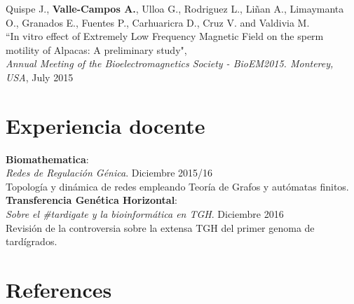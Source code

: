\documentclass[margin,line]{res}
\begin{document}
\begin{resume}
		Quispe J., \textbf{Valle-Campos A.}, Ulloa G., Rodriguez L., Liñan A., Limaymanta O., Granados E., Fuentes P., Carhuaricra D., Cruz V. and Valdivia M.\\ ``In vitro effect of Extremely Low Frequency Magnetic Field on the sperm motility of Alpacas: A preliminary study", \\ {\em Annual Meeting of the Bioelectromagnetics Society - BioEM2015. Monterey, USA}, July 2015\\
		
		
		
		
		\section{\sc Experiencia docente}
		{\bf Biomathematica}: \\ {\em Redes de Regulación Génica}. \hfill {Diciembre 2015/16}\\ Topología y dinámica de redes empleando Teoría de Grafos y autómatas finitos. \\ %
		{\bf Transferencia Genética Horizontal}: \\ {\em Sobre el \#tardigate y la bioinformática en TGH}. \hfill {Diciembre 2016}\\ Revisión de la controversia sobre la extensa TGH del primer genoma de tardígrados.\\
		
		
		\section{\sc References }
		

\end{resume}
\end{document}
